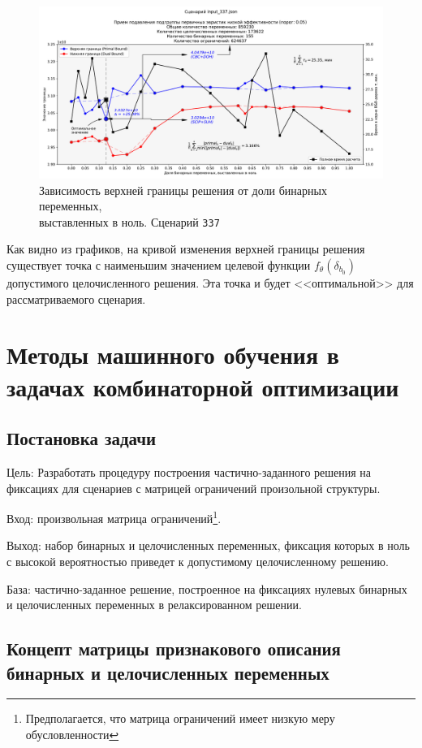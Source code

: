 \documentclass[%
	11pt,
	a4paper,
	utf8,
		]{article}
\begin{document}
\begin{figure}[!h]
	\centering
	\includegraphics[scale=0.45]{figures/337_frac_bin_zeros.pdf}
	\caption{ Зависимость верхней границы решения от доли бинарных переменных, \\выставленных в ноль. Сценарий \texttt{337} }\label{fig:337fracbinzeros}
\end{figure}

Как видно из графиков, на кривой изменения верхней границы решения существует точка с наименьшим значением целевой функции $ f_{\theta}(\delta_{b_0}) $ допустимого целочисленного решения. Эта точка и будет <<оптимальной>> для рассматриваемого сценария.

\section{Методы машинного обучения в задачах комбинаторной оптимизации}

\subsection{Постановка задачи}

Цель: Разработать процедуру построения частично-заданного решения на фиксациях для сценариев с матрицей ограничений произольной структуры.

Вход: произвольная матрица ограничений\footnote{Предполагается, что матрица ограничений имеет низкую меру обусловленности}.

Выход: набор бинарных и целочисленных переменных, фиксация которых в ноль с высокой вероятностью приведет к допустимому целочисленному решению.

База: частично-заданное решение, построенное на фиксациях нулевых бинарных и целочисленных переменных в релаксированном решении.

\subsection{Концепт матрицы признакового описания бинарных и целочисленных переменных}
\end{document}
